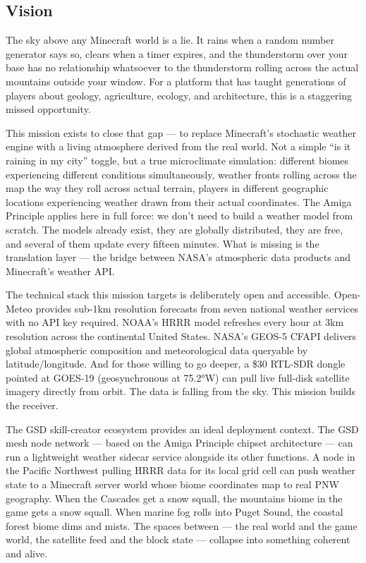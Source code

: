 \documentclass[11pt,letterpaper]{article}
\begin{document}
\subsection{Vision}

The sky above any Minecraft world is a lie. It rains when a random number generator says so, clears when a timer expires, and the thunderstorm over your base has no relationship whatsoever to the thunderstorm rolling across the actual mountains outside your window. For a platform that has taught generations of players about geology, agriculture, ecology, and architecture, this is a staggering missed opportunity.

This mission exists to close that gap --- to replace Minecraft's stochastic weather engine with a living atmosphere derived from the real world. Not a simple ``is it raining in my city'' toggle, but a true microclimate simulation: different biomes experiencing different conditions simultaneously, weather fronts rolling across the map the way they roll across actual terrain, players in different geographic locations experiencing weather drawn from their actual coordinates. The Amiga Principle applies here in full force: we don't need to build a weather model from scratch. The models already exist, they are globally distributed, they are free, and several of them update every fifteen minutes. What is missing is the translation layer --- the bridge between NASA's atmospheric data products and Minecraft's weather API.

The technical stack this mission targets is deliberately open and accessible. Open-Meteo provides sub-1km resolution forecasts from seven national weather services with no API key required. NOAA's HRRR model refreshes every hour at 3km resolution across the continental United States. NASA's GEOS-5 CFAPI delivers global atmospheric composition and meteorological data queryable by latitude/longitude. And for those willing to go deeper, a \$30 RTL-SDR dongle pointed at GOES-19 (geosynchronous at 75.2°W) can pull live full-disk satellite imagery directly from orbit. The data is falling from the sky. This mission builds the receiver.

The GSD skill-creator ecosystem provides an ideal deployment context. The GSD mesh node network --- based on the Amiga Principle chipset architecture --- can run a lightweight weather sidecar service alongside its other functions. A node in the Pacific Northwest pulling HRRR data for its local grid cell can push weather state to a Minecraft server world whose biome coordinates map to real PNW geography. When the Cascades get a snow squall, the mountains biome in the game gets a snow squall. When marine fog rolls into Puget Sound, the coastal forest biome dims and mists. The spaces between --- the real world and the game world, the satellite feed and the block state --- collapse into something coherent and alive.
\end{document}
